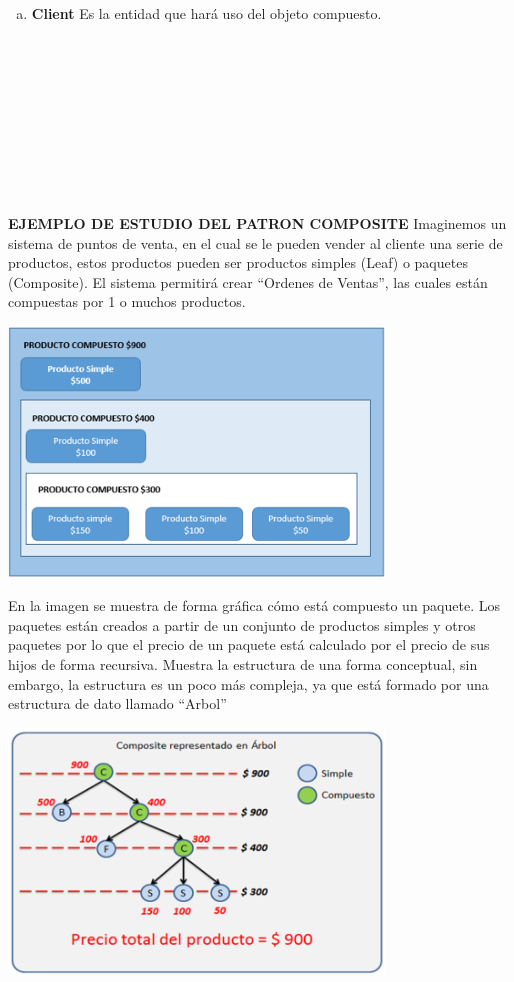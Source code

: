 \begin{flushleft}
\begin{enumerate}[a)]
	\item \textbf{ Client}
Es la entidad que hará uso del objeto compuesto.
    \end{enumerate}

\textbf{}\\ 
\textbf{}\\ 
\textbf{}\\ 
\textbf{}\\ 
\textbf{}\\ 
\textbf{}\\ 
\textbf{}\\ 
\textbf{}\\ 
\textbf{}\\ 
\textbf{EJEMPLO DE ESTUDIO DEL PATRON COMPOSITE}
Imaginemos un sistema de puntos de venta, en el cual se le pueden vender al cliente una serie de productos, estos productos pueden ser productos simples (Leaf) o paquetes (Composite).  El sistema permitirá crear “Ordenes de Ventas”, las cuales están compuestas por 1 o muchos productos.

\begin{center}
	\includegraphics[width=10cm]{./Imagenes/composite3} 
	\end{center}

En la imagen se muestra de forma gráfica cómo está compuesto un paquete.  Los paquetes están creados a partir de un conjunto de productos simples y otros paquetes por lo que el precio de un paquete está calculado por el precio de sus hijos de forma recursiva.  Muestra la estructura de una forma conceptual, sin embargo, la estructura es un poco más compleja, ya que está formado por una estructura de dato llamado “Arbol”

\begin{center}
	\includegraphics[width=10cm]{./Imagenes/composite4} 
	\end{center}


\end{flushleft}
